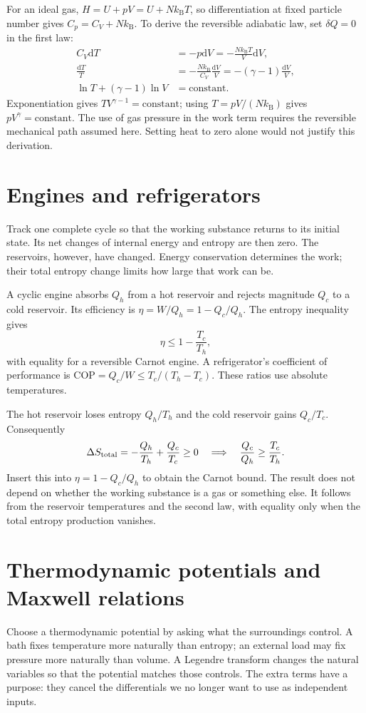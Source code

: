 \documentclass[11pt,oneside]{book}
\newcommand{\dd}{\mathrm{d}}
\newcommand{\kb}{k_{\mathrm B}}
\theoremstyle{reviewstyle}
\begin{document}
For an ideal gas, $H=U+pV=U+N\kb T$, so differentiation at fixed particle number gives $C_p=C_V+N\kb$. To derive the reversible adiabatic law, set $\delta Q=0$ in the first law:
\begin{align}
C_V\dd T&=-p\dd V=-\frac{N\kb T}{V}\dd V,\\
\frac{\dd T}{T}&=-\frac{N\kb}{C_V}\frac{\dd V}{V}
=-(\gamma-1)\frac{\dd V}{V},\\
\ln T+(\gamma-1)\ln V&=\text{constant}.
\end{align}
Exponentiation gives $TV^{\gamma-1}=\text{constant}$; using $T=pV/(N\kb)$ gives $pV^\gamma=\text{constant}$. The use of gas pressure in the work term requires the reversible mechanical path assumed here. Setting heat to zero alone would not justify this derivation.

\section{Engines and refrigerators}
Track one complete cycle so that the working substance returns to its initial state. Its net changes of internal energy and entropy are then zero. The reservoirs, however, have changed. Energy conservation determines the work; their total entropy change limits how large that work can be.

A cyclic engine absorbs $Q_h$ from a hot reservoir and rejects magnitude $Q_c$ to a cold reservoir. Its efficiency is $\eta=W/Q_h=1-Q_c/Q_h$. The entropy inequality gives
\begin{equation}\eta\leq1-\frac{T_c}{T_h},\end{equation}
with equality for a reversible Carnot engine. A refrigerator's coefficient of performance is $\mathrm{COP}=Q_c/W\leq T_c/(T_h-T_c)$. These ratios use absolute temperatures.

The hot reservoir loses entropy $Q_h/T_h$ and the cold reservoir gains $Q_c/T_c$. Consequently
\begin{equation}
\Delta S_{\rm total}=-\frac{Q_h}{T_h}+\frac{Q_c}{T_c}\geq0
\quad\Longrightarrow\quad \frac{Q_c}{Q_h}\geq\frac{T_c}{T_h}.
\end{equation}
Insert this into $\eta=1-Q_c/Q_h$ to obtain the Carnot bound. The result does not depend on whether the working substance is a gas or something else. It follows from the reservoir temperatures and the second law, with equality only when the total entropy production vanishes.

\section{Thermodynamic potentials and Maxwell relations}
Choose a thermodynamic potential by asking what the surroundings control. A bath fixes temperature more naturally than entropy; an external load may fix pressure more naturally than volume. A Legendre transform changes the natural variables so that the potential matches those controls. The extra terms have a purpose: they cancel the differentials we no longer want to use as independent inputs.
\end{document}
